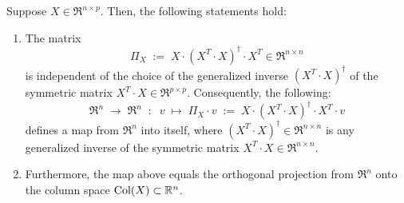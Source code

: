 \begin{theorem}
\mbox{}\vskip 0.1cm\noindent
Suppose $X \in \Re^{n \times p}$.
Then, the following statements hold:
\begin{enumerate}
\item
	The matrix
	\begin{equation*}
		\Pi_{X} \;:=\; X \cdot (X^{T} \cdot X)^{\dagger} \cdot X^{T} \in \Re^{n \times n}
	\end{equation*}
	is independent of the choice of the generalized inverse $(X^{T} \cdot X)^{\dagger}$
	of the symmetric matrix $X^{T} \cdot X \in \Re^{p \times p}$.
	Consequently, the following:
	\begin{equation*}
	\Re^{n} \; \longrightarrow \; \Re^{n}
	\;\; : \;\;
	v \; \longmapsto \; \Pi_{X}\cdot v \;:=\;X \cdot (X^{T} \cdot X)^{\dagger} \cdot X^{T} \cdot v
	\end{equation*}
	defines a map from $\Re^{n}$ into itself,
	where $(X^{T} \cdot X)^{\dagger} \in \Re^{n \times n}$
	is any generalized inverse of the symmetric matrix
	$X^{T} \cdot X \in \Re^{n \times n}$.
\item
	Furthermore, the map above equals the orthogonal projection
	from $\Re^{n}$ onto the column space $\textnormal{Col}(X) \subset \mathbb{R}^{n}$.
\end{enumerate}
\end{theorem}
\proof
